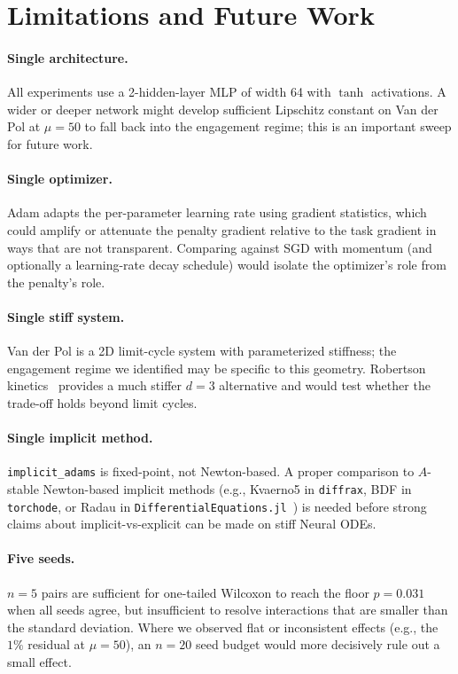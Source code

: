 \documentclass[11pt]{article}
\theoremstyle{plain}
\theoremstyle{definition}
\begin{document}
\section{Limitations and Future Work}
\label{sec:limitations}

\paragraph{Single architecture.}
All experiments use a 2-hidden-layer MLP of width 64 with $\tanh$
activations. A wider or deeper network might develop sufficient Lipschitz
constant on Van der Pol at $\mu = 50$ to fall back into the engagement
regime; this is an important sweep for future work.

\paragraph{Single optimizer.}
Adam adapts the per-parameter learning rate using gradient statistics, which
could amplify or attenuate the penalty gradient relative to the task gradient
in ways that are not transparent. Comparing against SGD with momentum (and
optionally a learning-rate decay schedule) would isolate the optimizer's role
from the penalty's role.

\paragraph{Single stiff system.}
Van der Pol is a 2D limit-cycle system with parameterized stiffness; the
engagement regime we identified may be specific to this geometry. Robertson
kinetics~\citep{robertson1966solution} provides a much stiffer
$d = 3$ alternative and would test whether the trade-off holds beyond limit
cycles.

\paragraph{Single implicit method.}
\texttt{implicit\_adams} is fixed-point, not Newton-based. A proper
comparison to $A$-stable Newton-based implicit methods (e.g., Kvaerno5 in
\texttt{diffrax}, BDF in \texttt{torchode}, or Radau in
\texttt{DifferentialEquations.jl}~\citep{rackauckas2017differentialequations})
is needed before strong claims about implicit-vs-explicit can be made on
stiff Neural ODEs.

\paragraph{Five seeds.}
$n = 5$ pairs are sufficient for one-tailed Wilcoxon to reach the floor
$p = 0.031$ when all seeds agree, but insufficient to resolve interactions
that are smaller than the standard deviation. Where we observed flat or
inconsistent effects (e.g., the $1\%$ residual at $\mu = 50$), an $n = 20$
seed budget would more decisively rule out a small effect.
\end{document}
